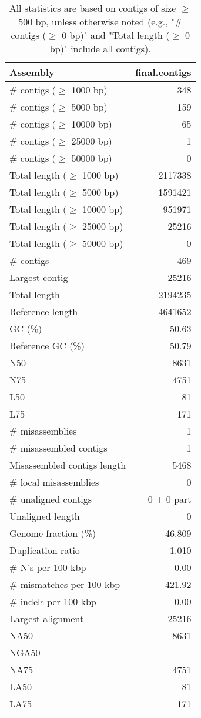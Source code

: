 \documentclass[12pt,a4paper]{article}
\begin{document}
\begin{table}[ht]
\begin{center}
\caption{All statistics are based on contigs of size $\geq$ 500 bp, unless otherwise noted (e.g., "\# contigs ($\geq$ 0 bp)" and "Total length ($\geq$ 0 bp)" include all contigs).}
\begin{tabular}{|l*{1}{|r}|}
\hline
Assembly & final.contigs \\ \hline
\# contigs ($\geq$ 1000 bp) & 348 \\ \hline
\# contigs ($\geq$ 5000 bp) & 159 \\ \hline
\# contigs ($\geq$ 10000 bp) & 65 \\ \hline
\# contigs ($\geq$ 25000 bp) & 1 \\ \hline
\# contigs ($\geq$ 50000 bp) & 0 \\ \hline
Total length ($\geq$ 1000 bp) & 2117338 \\ \hline
Total length ($\geq$ 5000 bp) & 1591421 \\ \hline
Total length ($\geq$ 10000 bp) & 951971 \\ \hline
Total length ($\geq$ 25000 bp) & 25216 \\ \hline
Total length ($\geq$ 50000 bp) & 0 \\ \hline
\# contigs & 469 \\ \hline
Largest contig & 25216 \\ \hline
Total length & 2194235 \\ \hline
Reference length & 4641652 \\ \hline
GC (\%) & 50.63 \\ \hline
Reference GC (\%) & 50.79 \\ \hline
N50 & 8631 \\ \hline
N75 & 4751 \\ \hline
L50 & 81 \\ \hline
L75 & 171 \\ \hline
\# misassemblies & 1 \\ \hline
\# misassembled contigs & 1 \\ \hline
Misassembled contigs length & 5468 \\ \hline
\# local misassemblies & 0 \\ \hline
\# unaligned contigs & 0 + 0 part \\ \hline
Unaligned length & 0 \\ \hline
Genome fraction (\%) & 46.809 \\ \hline
Duplication ratio & 1.010 \\ \hline
\# N's per 100 kbp & 0.00 \\ \hline
\# mismatches per 100 kbp & 421.92 \\ \hline
\# indels per 100 kbp & 0.00 \\ \hline
Largest alignment & 25216 \\ \hline
NA50 & 8631 \\ \hline
NGA50 & - \\ \hline
NA75 & 4751 \\ \hline
LA50 & 81 \\ \hline
LA75 & 171 \\ \hline
\end{tabular}
\end{center}
\end{table}
\end{document}
